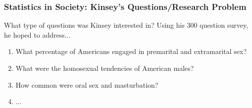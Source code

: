 \documentclass[slides]{beamer}
\begin{document}
\begin{frame}
\frametitle{Statistics in Society: Kinsey's Questions/Research Problem}
What type of questions was Kinsey interested in?  Using his 300 question survey, he hoped to address...

\begin{enumerate}
\pause \item What percentage of Americans engaged in premarital and extramarital sex?
\pause \item What were the homosexual tendencies of American males?
\pause \item How common were oral sex and masturbation?
\item $\ldots$
\end{enumerate}
\end{frame}
\end{document}
